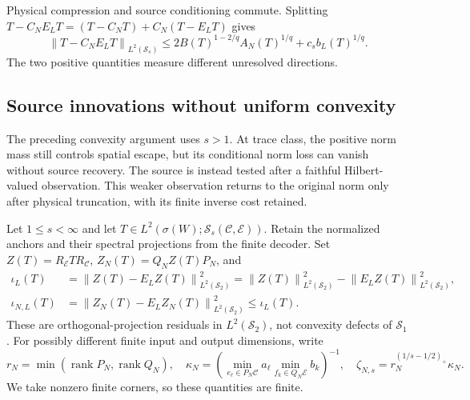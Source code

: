 \documentclass[11pt,a4paper]{amsart}
\numberwithin{equation}{section}
\theoremstyle{definition}
\theoremstyle{remark}
\newcommand{\cC}{\mathcal C}
\newcommand{\cE}{\mathcal E}
\newcommand{\Sch}{\mathcal S}
\DeclareMathOperator{\rank}{rank}
\newcommand{\norm}[1]{\left\lVert#1\right\rVert}
\begin{document}
Physical compression and source conditioning commute. Splitting
$T-C_NE_LT=(T-C_NT)+C_N(T-E_LT)$ gives
\begin{equation}\label{eq:doubletail}
 \norm{T-C_NE_LT}_{L^2(\Sch_s)}
 \le2B(T)^{1-2/q}A_N(T)^{1/q}+c_sb_L(T)^{1/q}.
\end{equation}
The two positive quantities measure different unresolved directions.

\subsection{Source innovations without uniform convexity}\label{subsec:anchored_source}
The preceding convexity argument uses $s>1$. At trace class, the positive norm mass still controls spatial escape, but its conditional norm loss can vanish without source recovery. The source is instead tested after a faithful Hilbert-valued observation. This weaker observation returns to the original norm only after physical truncation, with its finite inverse cost retained.

Let $1\le s<\infty$ and let $T\in L^2(\sigma(W);\Sch_s(\cC,\cE))$. Retain the normalized anchors and their spectral projections from the finite decoder. Set $Z(T)=R_\cE TR_\cC$, $Z_N(T)=Q_NZ(T)P_N$, and
\begin{align}
 \iota_L(T)&=\norm{Z(T)-E_LZ(T)}_{L^2(\Sch_2)}^2
 =\norm{Z(T)}_{L^2(\Sch_2)}^2-\norm{E_LZ(T)}_{L^2(\Sch_2)}^2,
 \label{eq:anchored_source_defect}\\
 \iota_{N,L}(T)&=\norm{Z_N(T)-E_LZ_N(T)}_{L^2(\Sch_2)}^2
 \le\iota_L(T).\label{eq:localized_source_defect}
\end{align}
These are orthogonal-projection residuals in $L^2(\Sch_2)$, not convexity defects of $\Sch_1$. For possibly different finite input and output dimensions, write
\[
 r_N=\min(\rank P_N,\rank Q_N),\quad
 \kappa_N=\left(\min_{e_\ell\in P_N\cC}a_\ell
                   \min_{f_k\in Q_N\cE}b_k\right)^{-1},\quad
 \zeta_{N,s}=r_N^{(1/s-1/2)_+}\kappa_N.
\]
We take nonzero finite corners, so these quantities are finite.
\end{document}
